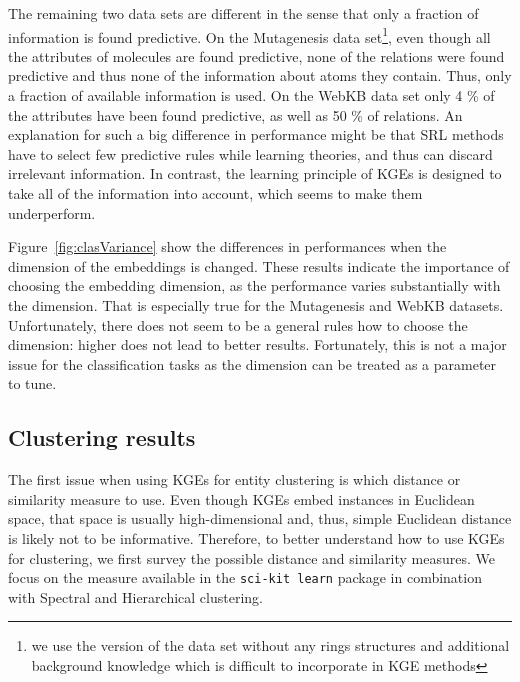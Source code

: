 The remaining two data sets are different in the sense that only a fraction of information is found predictive.
On the Mutagenesis data set\footnote{we use the version of the data set without any rings structures and additional background knowledge which is difficult to incorporate in KGE methods}, even though all the attributes of molecules are found predictive, none of the relations were found predictive and thus none of the information about atoms they contain.
Thus, only a fraction of available information is used.
On the WebKB data set only 4 \% of the attributes have been found predictive, as well as 50 \% of relations.
An explanation for such a big difference in performance might be that SRL methods have to select few predictive rules while learning theories, and thus can discard irrelevant information.
In contrast, the learning principle of KGEs is designed to take all of the information into account, which seems to make them underperform.



Figure~\ref{fig:clasVariance} show the differences in performances when the dimension of the embeddings is changed.
These results indicate the importance of choosing the embedding dimension, as the performance varies substantially with the dimension.
That is especially true for the Mutagenesis and WebKB datasets.
Unfortunately, there does not seem to be a general rules how to choose the dimension: higher does not lead to better results.
Fortunately, this is not a major issue for the classification tasks as the dimension can be treated as a parameter to tune.






\subsection{Clustering results}

The first issue when using KGEs for entity clustering is which distance or similarity measure to use.
Even though KGEs embed instances in Euclidean space, that space is usually high-dimensional and, thus, simple Euclidean distance is likely not to be informative.
Therefore, to better understand how to use KGEs for clustering, we first survey the possible distance and similarity measures.
We focus on the measure available in the \texttt{sci-kit learn} package \cite{scikit-learn} in combination with Spectral and Hierarchical clustering.




